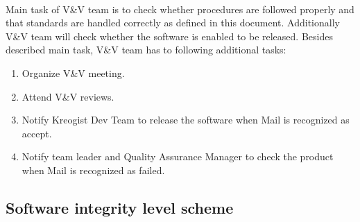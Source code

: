 \documentclass[11pt,a4paper]{article}
\begin{document}
            \paragraph{} Main task of V\&V team is to check whether procedures are followed properly and that standards are handled correctly as defined in this document. Additionally V\&V team will check whether the software is enabled to be released. Besides described main task, V\&V team has to following additional tasks:
            \begin{enumerate}
                \item Organize V\&V meeting.
                \item Attend V\&V reviews.
                \item Notify Kreogist Dev Team to release the software when Mail is recognized as accept.
                \item Notify team leader and Quality Assurance Manager to check the product when Mail is recognized as failed.
            \end{enumerate}
        \subsection{Software integrity level scheme}
\end{document}
